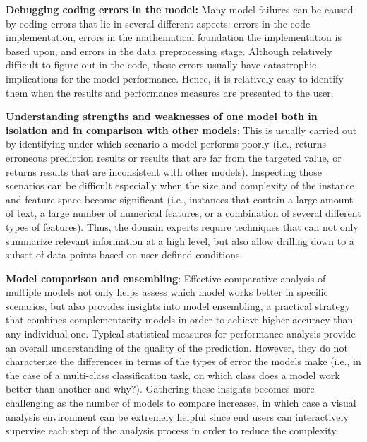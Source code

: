 \documentclass[preprint,journal]{vgtc}       %
\begin{document}
\textbf{Debugging coding errors in the model:} Many model failures can be caused by coding errors that lie in several different aspects: errors in the code implementation, errors in the mathematical foundation the implementation is based upon, and errors in the data preprocessing stage. Although relatively difficult to figure out in the code, those errors usually have catastrophic implications for the model performance. Hence, it is relatively easy to identify them when the results and performance measures are presented to the user.

\textbf{Understanding strengths and weaknesses of one model both in isolation and in comparison with other models}: This is usually carried out by identifying under which scenario a model  performs poorly (i.e., returns erroneous prediction results or results that are far from the targeted value, or returns results that are inconsistent with other models). Inspecting those scenarios can be difficult especially when the size and complexity of the instance and feature space become significant (i.e., instances that contain a large amount of text, a large number of numerical features, or a combination of several different types of features). Thus, the domain experts require techniques that can not only summarize relevant information at a high level, but also allow drilling down to a subset of data points based on user-defined conditions.

\textbf{Model comparison and ensembling}: Effective comparative analysis of multiple models not only helps assess which model works better in specific scenarios, but also provides insights into model ensembling, a practical strategy that combines complementarity models in order to achieve higher accuracy than any individual one. Typical statistical measures for performance analysis provide an overall understanding of the quality of the prediction. However, they do not characterize the differences in terms of the types of error the models make (i.e., in the case of a multi-class classification task, on which class does a model work better than another and why?). Gathering these insights becomes more challenging as the number of models to compare increases, in which case a visual analysis environment can be extremely helpful since end users can interactively supervise each step of the analysis process in order to reduce the complexity.
\end{document}

